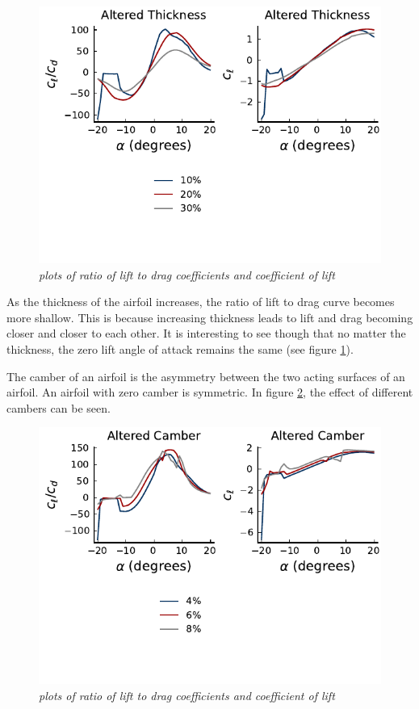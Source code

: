 \documentclass{journal}
\begin{document}
	\begin{figure}
		\centering
		\includegraphics{../graphics/altered-thickness.pdf}
		\caption{\emph{plots of ratio of lift to drag coefficients and coefficient of lift}}
		\label{fig:altered-thickness}
	\end{figure}
	
	As the thickness of the airfoil increases, the ratio of lift to drag curve becomes more shallow. This is because increasing thickness leads to lift and drag becoming closer and closer to each other. It is interesting to see though that no matter the thickness, the zero lift angle of attack remains the same (see figure \ref{fig:altered-thickness}).
	
	The camber of an airfoil is the asymmetry between the two acting surfaces of an airfoil. An airfoil with zero camber is symmetric. In figure \ref{fig:altered-camber}, the effect of different cambers can be seen.
	
	\begin{figure}
		\centering
		\includegraphics{../graphics/altered-camber.pdf}
		\caption{\emph{plots of ratio of lift to drag coefficients and coefficient of lift}}
		\label{fig:altered-camber}
	\end{figure}
	
\end{document}
